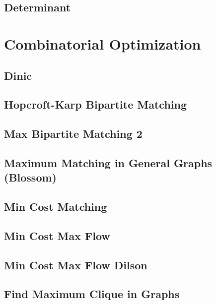 \subsection{Determinant}
\raggedbottom
\hrulefill

\section{Combinatorial Optimization}
\subsection{Dinic}
\raggedbottom
\hrulefill
\subsection{Hopcroft-Karp Bipartite Matching}
\raggedbottom
\hrulefill
\subsection{Max Bipartite Matching 2}
\raggedbottom
\hrulefill
\subsection{Maximum Matching in General Graphs (Blossom)}
\raggedbottom
\hrulefill
\subsection{Min Cost Matching}
\raggedbottom
\hrulefill
\subsection{Min Cost Max Flow}
\raggedbottom
\hrulefill
\subsection{Min Cost Max Flow Dilson}
\raggedbottom
\hrulefill
\subsection{Find Maximum Clique in Graphs}
\raggedbottom
\hrulefill

